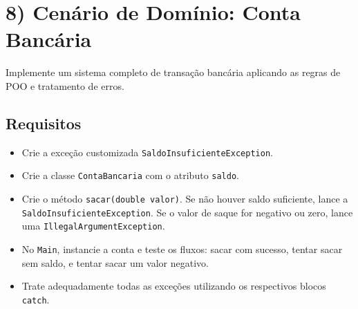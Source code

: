 \documentclass[12pt]{article}
\begin{document}
\section*{8) Cenário de Domínio: Conta Bancária}
Implemente um sistema completo de transação bancária aplicando as regras de POO e tratamento de erros.

\begin{center}
\end{center}

\subsection*{Requisitos}
\begin{itemize}
    \item Crie a exceção customizada \texttt{SaldoInsuficienteException}.
    \item Crie a classe \texttt{ContaBancaria} com o atributo \texttt{saldo}.
    \item Crie o método \texttt{sacar(double valor)}. Se não houver saldo suficiente, lance a \texttt{SaldoInsuficienteException}. Se o valor de saque for negativo ou zero, lance uma \texttt{IllegalArgumentException}.
    \item No \texttt{Main}, instancie a conta e teste os fluxos: sacar com sucesso, tentar sacar sem saldo, e tentar sacar um valor negativo.
    \item Trate adequadamente todas as exceções utilizando os respectivos blocos \texttt{catch}.
\end{itemize}
\end{document}
